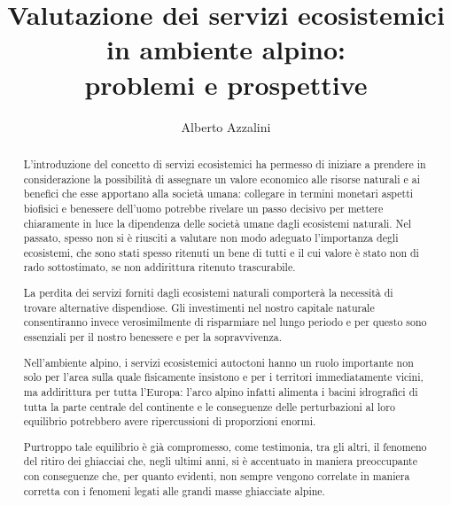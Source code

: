 \documentclass[14pt,a4paper]{article}
\author{Alberto Azzalini}
\title{Valutazione dei servizi ecosistemici in ambiente alpino:\\ problemi e prospettive}
\begin{document}
	\maketitle
	\tableofcontents
	\begin{abstract}
		L'introduzione del concetto di servizi ecosistemici ha permesso di iniziare a prendere in considerazione la possibilità di assegnare un valore economico alle risorse naturali e ai benefici che esse apportano alla società umana: collegare in termini monetari aspetti biofisici e benessere dell'uomo potrebbe rivelare un passo decisivo per mettere chiaramente in luce la dipendenza delle società umane dagli ecosistemi naturali.
		Nel passato, spesso non si è riusciti a valutare non modo adeguato l'importanza degli ecosistemi, che sono stati spesso ritenuti un bene di tutti e il cui valore è stato non di rado sottostimato, se non addirittura ritenuto trascurabile.
		
		La perdita dei servizi forniti dagli ecosistemi naturali comporterà la necessità di trovare alternative dispendiose. Gli investimenti nel nostro capitale naturale consentiranno invece verosimilmente di risparmiare nel lungo periodo e per questo sono essenziali per il nostro benessere e per la sopravvivenza.
		
		Nell'ambiente alpino, i servizi ecosistemici autoctoni hanno un ruolo importante non solo per l'area sulla quale fisicamente insistono e per i territori immediatamente vicini, ma addirittura per tutta l'Europa: l'arco alpino infatti alimenta i bacini idrografici di tutta la parte centrale del continente e le conseguenze delle perturbazioni al loro equilibrio potrebbero avere ripercussioni di proporzioni enormi.
		
		Purtroppo tale equilibrio è già compromesso, come testimonia, tra gli altri, il fenomeno del ritiro dei ghiacciai che, negli ultimi anni, si è accentuato in maniera preoccupante con conseguenze che, per quanto evidenti, non sempre vengono correlate in maniera corretta con i fenomeni legati alle grandi masse ghiacciate alpine.
		
		
	\end{abstract}
	
\end{document}
